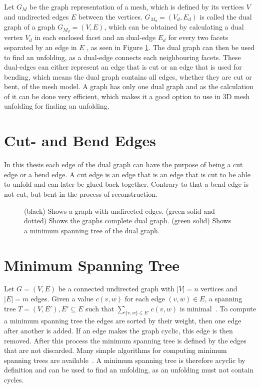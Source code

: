 \documentclass[draft,final]{vutinfth} %
\begin{document}
Let $G_M$ be the graph representation of a mesh, which is defined by its vertices $V$ and undirected edges $E$ between the vertices. $G_{M_d} = (V_d, E_d)$ is called the dual graph of a graph $G_{M_d} = (V,E)$, which can be obtained by calculating a dual vertex $V_d$ in each enclosed facet and an dual-edge $E_d$ for every two facets separated by an edge in $E$ \cite{gross2004handbook}, as seen in Figure \ref{fig:dualgraph}. The dual graph can then be used to find an unfolding, as a dual-edge connects each neighbouring facets. These dual-edges can either represent an edge that is cut or an edge that is used for bending, which means the dual graph contains all edges, whether they are cut or bent, of the mesh model. A graph has only one dual graph and as the calculation of it can be done very efficient, which makes it a good option to use in 3D mesh unfolding for finding an unfolding.

\section{Cut- and Bend Edges}
In this thesis each edge of the dual graph can have the purpose of being a cut edge or a bend edge. A cut edge is an edge that is an edge that is cut to be able to unfold and can later be glued back together. Contrary to that a bend edge is not cut, but bent in the process of reconstruction.

\begin{figure}

\caption{(black) Shows a graph with undirected edges. (green solid and dotted) Shows the graphs complete dual graph. (green solid) Shows a minimum spanning tree of the dual graph.}
\label{fig:dualgraph}
\end{figure}

\section{Minimum Spanning Tree}

Let $G = (V,E)$ be a connected undirected graph with $|V| = n$ vertices and $|E| = m$ edges. Given a value $c(v,w)$ for each edge $(v,w) \in E$, a spanning tree $T = (V,E'), E' \subseteq E$ such that $\sum_{\{v,w\}\in E'} c(v,w)$ is minimal~\cite{cheriton1976finding}. To compute a minimum spanning tree the edges are sorted by their weight, then one edge after another is added. If an edge makes the graph cyclic, this edge is then removed. After this process the minimum spanning tree is defined by the edges that are not discarded. Many simple algorithms for computing minimum spanning trees are available~\cite{kruskal1956shortest,ahuja1990faster}. A minimum spanning tree is therefore acyclic by definition and can be used to find an unfolding, as an unfolding must not contain cycles. 
\end{document}
